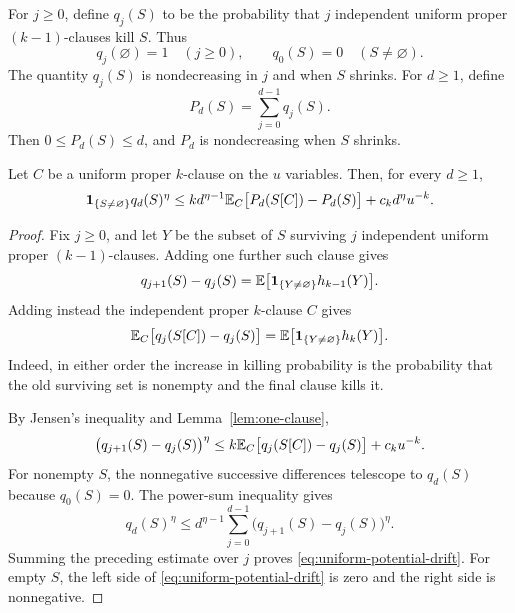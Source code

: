 For $j\ge0$, define $q_j(S)$ to be the probability that $j$ independent
uniform proper $(k-1)$-clauses kill $S$.  Thus
\[
    q_j(\varnothing)=1\quad(j\ge0),
    \qquad
    q_0(S)=0\quad(S\ne\varnothing).
\]
The quantity $q_j(S)$ is nondecreasing in $j$ and when $S$ shrinks.  For
$d\ge1$, define
\begin{equation}
    P_d(S)=\sum_{j=0}^{d-1}q_j(S).
    \label{eq:potential-definition}
\end{equation}
Then $0\le P_d(S)\le d$, and $P_d$ is nondecreasing when $S$ shrinks.

\begin{lemma}
\label{lem:uniform-potential}
Let $C$ be a uniform proper $k$-clause on the $u$ variables.  Then, for every
$d\ge1$,
\begin{equation}
    \mathbf 1_{\{S\ne\varnothing\}}q_d(S)^\eta
    \le
    k d^{\eta-1}
       \mathbb E_C\bigl[P_d(S[C])-P_d(S)\bigr]
    +c_k d^\eta u^{-k}.
    \label{eq:uniform-potential-drift}
\end{equation}
\end{lemma}

\begin{proof}
Fix $j\ge0$, and let $Y$ be the subset of $S$ surviving $j$ independent
uniform proper $(k-1)$-clauses.  Adding one further such clause gives
\begin{equation}
    q_{j+1}(S)-q_j(S)
    =\mathbb E\bigl[\mathbf 1_{\{Y\ne\varnothing\}}h_{k-1}(Y)\bigr].
    \label{eq:short-increment}
\end{equation}
Adding instead the independent proper $k$-clause $C$ gives
\begin{equation}
    \mathbb E_C\bigl[q_j(S[C])-q_j(S)\bigr]
    =\mathbb E\bigl[\mathbf 1_{\{Y\ne\varnothing\}}h_k(Y)\bigr].
    \label{eq:long-increment}
\end{equation}
Indeed, in either order the increase in killing probability is the
probability that the old surviving set is nonempty and the final clause
kills it.

By Jensen's inequality and Lemma~\ref{lem:one-clause},
\[
    \bigl(q_{j+1}(S)-q_j(S)\bigr)^\eta
    \le
    k\mathbb E_C\bigl[q_j(S[C])-q_j(S)\bigr]+c_k u^{-k}.
\]
For nonempty $S$, the nonnegative successive differences telescope to
$q_d(S)$ because $q_0(S)=0$.  The power-sum inequality gives
\[
    q_d(S)^\eta
    \le
    d^{\eta-1}
    \sum_{j=0}^{d-1}
      \bigl(q_{j+1}(S)-q_j(S)\bigr)^\eta.
\]
Summing the preceding estimate over $j$ proves
\eqref{eq:uniform-potential-drift}.  For empty $S$, the left side of
\eqref{eq:uniform-potential-drift} is zero and the right side is
nonnegative.
\end{proof}

